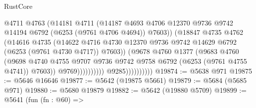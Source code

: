 \begin{lexlean}{RustCore}
\begin{coremodule}
                                        @4711
                                        @4763
                                        (@14181
                                          @4711
                                          (@14187
                                            @4693
                                            @4706
                                            @12370
                                            @9736
                                            @9742
                                            @14194
                                            @6792
                                            (@6253 (@9761 @4706 @4694))
                                            @7603))
                                        (@18847
                                          @4735
                                          @4762
                                          (@14616
                                            @4735
                                            (@14622
                                              @4716
                                              @4730
                                              @12370
                                              @9736
                                              @9742
                                              @14629
                                              @6792
                                              (@6253 (@9761 @4730 @4717))
                                              @7603))
                                          (@9678
                                            @4760
                                            @1377
                                            (@9683
                                              @4760
                                              (@9698
                                                @4740
                                                @4755
                                                @9707
                                                @9736
                                                @9742
                                                @9758
                                                @6792
                                                (@6253 (@9761 @4755 @4741))
                                                @7603))
                                            @9769))))))))))
                        @9285))))))))))
@19874 := @5638 @971
@19875 := @5646 @16646
@19877 := @5642 (@19875 @5661)
@19879 := @5684 (@5685 @971)
@19880 := @5680 @19879
@19882 := @5642 (@19880 @5709)
@19899 := @5641
    (fun (fn : @60) =>

\end{coremodule}
\end{lexlean}
